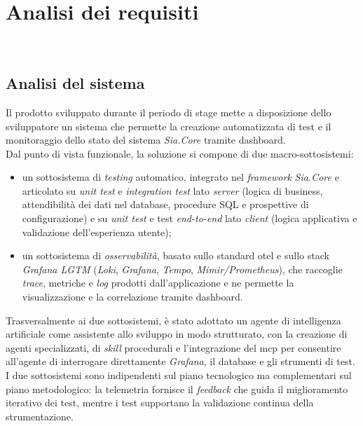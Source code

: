 \chapter{Analisi dei requisiti}
\label{cap:analisi-requisiti}

\\

\section{Analisi del sistema}
Il prodotto sviluppato durante il periodo di stage mette a disposizione dello sviluppatore un sistema che permette la creazione automatizzata di test e il monitoraggio dello stato del sistema \emph{Sia.Core} tramite dashboard.
\\
Dal punto di vista funzionale, la soluzione si compone di due macro-sottosistemi:
\begin{itemize}
  \item un sottosistema di \emph{testing} automatico, integrato nel \emph{framework} \emph{Sia.Core} e articolato su \emph{unit test} e \emph{integration test} lato \emph{server} (logica di business, attendibilità dei dati nel database, procedure SQL e prospettive di configurazione) e su \emph{unit test} e test \emph{end-to-end} lato \emph{client} (logica applicativa e validazione dell'esperienza utente);
  \item un sottosistema di \emph{osservabilità}, basato sullo standard \gls{otel} e sullo stack \emph{Grafana LGTM} (\emph{Loki}, \emph{Grafana}, \emph{Tempo}, \emph{Mimir/Prometheus}), che raccoglie \emph{trace}, metriche e \emph{log} prodotti dall'applicazione e ne permette la visualizzazione e la correlazione tramite dashboard.
\end{itemize}
Trasversalmente ai due sottosistemi, è stato adottato un agente di intelligenza artificiale come assistente allo sviluppo in modo strutturato, con la creazione di agenti specializzati, di \emph{skill} procedurali e l'integrazione del \gls{mcp} per consentire all'agente di interrogare direttamente \emph{Grafana}, il database e gli strumenti di test.
I due sottosistemi sono indipendenti sul piano tecnologico ma complementari sul piano metodologico: la telemetria fornisce il \emph{feedback} che guida il miglioramento iterativo dei test, mentre i test supportano la validazione continua della strumentazione.

